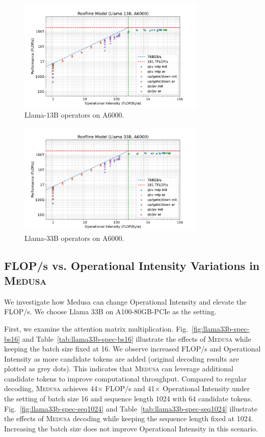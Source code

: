 \documentclass{article}
\theoremstyle{plain}
\theoremstyle{definition}
\theoremstyle{remark}
\newcommand{\ours}
{\textsc{Medusa}\xspace}
\begin{document}
\begin{figure}[h]
    \centering
    \includegraphics[width=0.8\textwidth]{llama13b-roofline-a6000.pdf}
    \caption{Llama-13B operators on A6000.}
    \label{fig:llama13b-roofline-a6000}
\end{figure}

\begin{figure}[h]
    \centering
    \includegraphics[width=0.8\textwidth]{llama33b-roofline-a6000.pdf}
    \caption{Llama-33B operators on A6000.}
    \label{fig:llama33b-roofline-a6000}
\end{figure}

\clearpage



\subsection{FLOP/s vs. Operational Intensity Variations in \ours}

We investigate how Medusa can change Operational Intensity and elevate the FLOP/s.
We choose Llama 33B on A100-80GB-PCIe as the setting. 

First, we examine the attention matrix multiplication. Fig.~\ref{fig:llama33b-spec-bs16} and Table~\ref{tab:llama33b-spec-bs16} illustrate the effects of \ours while keeping the batch size fixed at 16. We observe increased FLOP/s and Operational Intensity as more candidate tokens are added (original decoding results are plotted as grey dots). This indicates that \ours can leverage additional candidate tokens to improve computational throughput. Compared to regular decoding, \ours achieves 44$\times$ FLOP/s and 41$\times$ Operational Intensity under the setting of batch size 16 and sequence length 1024 with 64 candidate tokens.
 Fig.~\ref{fig:llama33b-spec-seq1024} and Table~\ref{tab:llama33b-spec-seq1024} illustrate the effects of \ours decoding while keeping the sequence length fixed at 1024. Increasing the batch size does not improve Operational Intensity in this scenario. 
\end{document}
